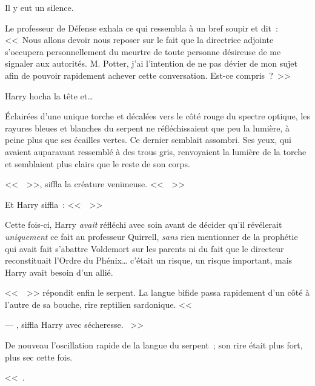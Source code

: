 Il y eut un silence.

Le professeur de Défense exhala ce qui ressembla à un bref soupir et dit~: <<~Nous allons devoir nous reposer sur le fait que la directrice adjointe s'occupera personnellement du meurtre de toute personne désireuse de me signaler aux autorités. M. Potter, j'ai l'intention de ne pas dévier de mon sujet afin de pouvoir rapidement achever cette conversation. Est-ce compris~?~>>

Harry hocha la tête et…

Éclairées d'une unique torche et décalées vers le côté rouge du spectre optique, les rayures bleues et blanches du serpent ne réfléchissaient que peu la lumière, à peine plus que ses écailles vertes. Ce dernier semblait assombri. Ses yeux, qui avaient auparavant ressemblé à des trous gris, renvoyaient la lumière de la torche et semblaient plus clairs que le reste de son corps.

<<~~>>, siffla la créature venimeuse. <<~~>>

Et Harry siffla~: <<~~>>

Cette fois-ci, Harry \emph{avait} réfléchi avec soin avant de décider qu'il révélerait \emph{uniquement} ce fait au professeur Quirrell, \emph{sans} rien mentionner de la prophétie qui avait fait s'abattre Voldemort sur les parents ni du fait que le directeur reconstituait l'Ordre du Phénix… c'était un risque, un risque important, mais Harry avait besoin d'un allié.

<<~~>> répondit enfin le serpent. La langue bifide passa rapidement d'un côté à l'autre de sa bouche, rire reptilien sardonique. <<~

--- , siffla Harry avec sécheresse. ~>>

De nouveau l'oscillation rapide de la langue du serpent~; son rire était plus fort, plus sec cette fois.

<<~.


